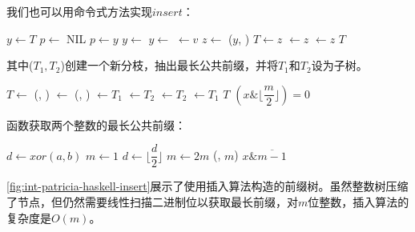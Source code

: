 \documentclass[b5paper]{ctexart}
\begin{document}
我们也可以用命令式方法实现$insert$：

\begin{algorithmic}[1]
    \State \Return {}
  \EndIf
  \State $y \gets T$
  \State $p \gets$ NIL
    \State $p \gets y$
      \State $y \gets$ 
    \Else
      \State $y \gets$ 
    \EndIf
  \EndWhile
    \State {} $\gets v$
  \Else
    \State $z \gets$ ($y$, )
      \State $T \gets z$
    \Else
        \State {} $\gets z$
      \Else
        \State {} $\gets z$
      \EndIf
    \EndIf
  \EndIf
  \State \Return $T$
\EndFunction
\end{algorithmic}

其中($T_1, T_2$)创建一个新分枝，抽出最长公共前缀，并将$T_1$和$T_2$设为子树。

\begin{algorithmic}[1]
  \State $T \gets$ 
  \State (, ) $\gets$ (, )
    \State {} $\gets T_1$
    \State {} $\gets T_2$
  \Else
    \State {} $\gets T_2$
    \State {} $\gets T_1$
  \EndIf
  \State \Return $T$
\EndFunction
\Statex
{}
  \State \Return $(x \& \lfloor \dfrac{m}{2} \rfloor) = 0$
\EndFunction
\end{algorithmic}

函数获取两个整数的最长公共前缀：

\begin{algorithmic}[1]
  \State $d \gets xor(a, b)$
  \State $m \gets 1$
    \State $d \gets \lfloor \dfrac{d}{2} \rfloor$
    \State $m \gets 2m$
  \EndWhile
  \State \Return (, $m$)
\EndFunction
\Statex
{}
  \State \Return $x \& \overline{m - 1}$
\EndFunction
\Statex
\end{algorithmic}

\cref{fig:int-patricia-haskell-insert}展示了使用插入算法构造的前缀树。虽然整数树压缩了节点，但仍然需要线性扫描二进制位以获取最长前缀，对$m$位整数，插入算法的复杂度是$O(m)$。
\end{document}
